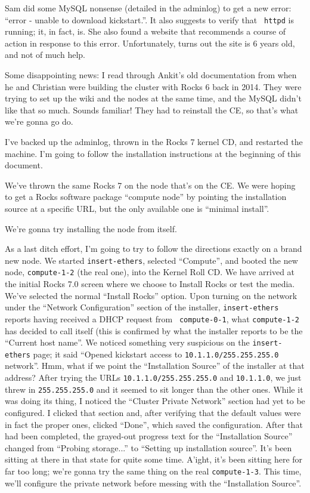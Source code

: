 \documentclass[12pt]{article}
\begin{document}
\qq Sam did some MySQL nonsense (detailed in the adminlog) to get a new error:
``error - unable to download kickstart.''. It also suggests to verify that {\tt
  httpd} is running; it, in fact, is. She also found a website that recommends a
course of action in response to this error. Unfortunately, turns out the site is
6 years old, and not of much help.

\qq Some disappointing news: I read through Ankit's old documentation from when
he and Christian were building the cluster with Rocks 6 back in 2014. They were
trying to set up the wiki and the nodes at the same time, and the MySQL didn't
like that so much. Sounds familiar! They had to reinstall the CE, so that's what
we're gonna go do.

\qq I've backed up the adminlog, thrown in the Rocks 7 kernel CD, and restarted
the machine. I'm going to follow the installation instructions at the beginning
of this document.

\qq We've thrown the same Rocks 7 on the node that's on the CE. We were hoping
to get a Rocks software package ``compute node'' by pointing the installation
source at a specific URL, but the only available one is ``minimal install''. 

\qq We're gonna try installing the node from itself.

\qq As a last ditch effort, I'm going to try to follow the directions exactly on
a brand new node. We started {\tt insert-ethers}, selected ``Compute'', and
booted the new node, {\tt compute-1-2} (the real one), into the Kernel Roll
CD. We have arrived at the initial Rocks 7.0 screen where we choose to Install
Rocks or test the media. We've selected the normal ``Install Rocks'' option.
Upon turning on the network under the ``Network Configuration'' section of the
installer, {\tt insert-ethers} reports having received a DHCP request from {\tt
  compute-0-1}, what {\tt compute-1-2} has decided to call itself (this is
confirmed by what the installer reports to be the ``Current host name''.  We
noticed something very suspicious on the {\tt insert-ethers} page; it said
``Opened kickstart access to {\tt 10.1.1.0/255.255.255.0} network''. Hmm, what
if we point the ``Installation Source'' of the installer at that address?  After
trying the URLs {\tt 10.1.1.0/255.255.255.0} and {\tt 10.1.1.0}, we just threw
in {\tt 255.255.255.0} and it seemed to sit longer than the other ones. While it
was doing its thing, I noticed the ``Cluster Private Network'' section had yet
to be configured. I clicked that section and, after verifying that the default
values were in fact the proper ones, clicked ``Done'', which saved the
configuration. After that had been completed, the grayed-out progress text for
the ``Installation Source'' changed from ``Probing storage...'' to ``Setting up
installation source''. It's been sitting at there in that state for quite some
time. A'ight, it's been sitting here for far too long; we're gonna try the same
thing on the real {\tt compute-1-3}. This time, we'll configure the private
network before messing with the ``Installation Source''.
\end{document}
